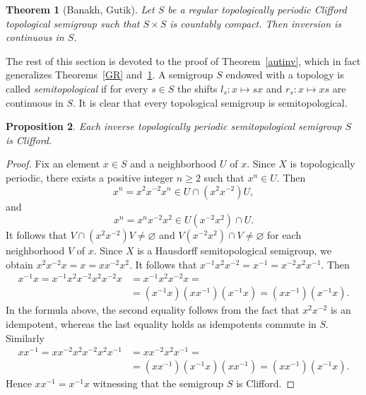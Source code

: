 \documentclass[12pt, twoside, leqno]{article}
\newtheorem{theorem}{Theorem}[section]
\newtheorem{proposition}[theorem]{Proposition}
\theoremstyle{definition}
\numberwithin{equation}{section}
\newcommand{\var}{\varnothing}
\begin{document}
\begin{theorem}[Banakh, Gutik]\label{BG1}
Let $S$ be a regular topologically periodic Clifford topological semigroup such that $S{\times}S$ is countably compact. Then inversion is continuous in $S$.    
\end{theorem}

The rest of this section is devoted to the proof of Theorem~\ref{autinv}, which in fact generalizes Theorems~\ref{GR} and~\ref{BG1}. 
A semigroup $S$ endowed with a topology is called {\em semitopological}  if for every $s\in S$ the shifts $l_s: x\mapsto sx$ and $r_s: x\mapsto xs$ are continuous in $S$. It is clear that every topological semigroup is semitopological.



\begin{proposition}\label{periodic}
Each inverse topologically periodic semitopological semigroup $S$ is Clifford.  
\end{proposition}

\begin{proof}
Fix an element $x\in S$ and a neighborhood $U$ of $x$. Since $X$ is topologically periodic, there exists a positive integer $n\geq 2$ such that $x^n\in U$. Then $$x^n=x^2x^{-2}x^n\in U\cap (x^{2}x^{-2})U,$$
and 
$$x^n=x^nx^{-2}x^2\in U(x^{-2}x^{2})\cap U.$$
It follows that $V\cap (x^2x^{-2})V\neq \var$ and  $V(x^{-2}x^{2})\cap V\neq \var$ for each neighborhood $V$ of $x$. Since $X$ is a Hausdorff semitopological semigroup, we obtain $x^{2}x^{-2}x=x=xx^{-2}x^2$. It follows that $x^{-1}x^{2}x^{-2}=x^{-1}=x^{-2}x^2x^{-1}$.
Then
\begin{align*}
x^{-1}x=x^{-1}x^2x^{-2}x^2x^{-2}x&=x^{-1}x^2x^{-2}x=\\
&=(x^{-1}x)(xx^{-1})(x^{-1}x)=(xx^{-1})(x^{-1}x).
\end{align*}
In the formula above, the second equality follows from the fact that $x^{2}x^{-2}$ is an idempotent, whereas the last equality holds as idempotents commute in $S$. 
Similarly
\begin{align*}
xx^{-1}=xx^{-2}x^{2}x^{-2}x^2x^{-1}&=xx^{-2}x^{2}x^{-1}=\\
&=(xx^{-1})(x^{-1}x)(xx^{-1})=(xx^{-1})(x^{-1}x).
\end{align*}
Hence $xx^{-1}=x^{-1}x$ witnessing that the semigroup $S$ is Clifford.
\end{proof}
\end{document}
